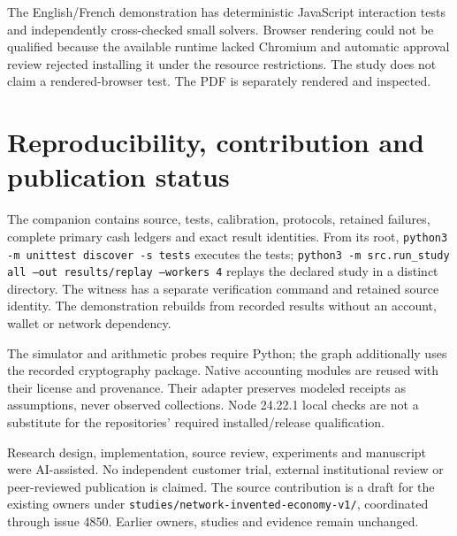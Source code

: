 \documentclass[11pt,letterpaper]{article}
\begin{document}
The English/French demonstration has deterministic JavaScript interaction tests
and independently cross-checked small solvers. Browser rendering could not be
qualified because the available runtime lacked Chromium and automatic approval
review rejected installing it under the resource restrictions. The study does
not claim a rendered-browser test. The PDF is separately rendered and inspected.

\section*{Reproducibility, contribution and publication status}

The companion contains source, tests, calibration, protocols, retained failures,
complete primary cash ledgers and exact result identities. From its root,
\texttt{python3 -m unittest discover -s tests} executes the tests;
\texttt{python3 -m src.run\_study all --out results/replay --workers 4}
replays the declared study in a distinct directory. The witness has a separate
verification command and retained source identity. The demonstration rebuilds
from recorded results without an account, wallet or network dependency.

The simulator and arithmetic probes require Python; the graph additionally uses
the recorded cryptography package. Native accounting modules are reused with
their license and provenance. Their adapter preserves modeled receipts as
assumptions, never observed collections. Node 24.22.1 local checks are not a
substitute for the repositories' required installed/release qualification.

Research design, implementation, source review, experiments and manuscript were
AI-assisted. No independent customer trial, external institutional review or
peer-reviewed publication is claimed. The source contribution is a draft for
the existing owners under \texttt{studies/network-invented-economy-v1/}, coordinated
through issue 4850. Earlier owners, studies and evidence remain unchanged.

\begingroup
\small
\setlength{\bibsep}{5pt}


\endgroup
\end{document}
